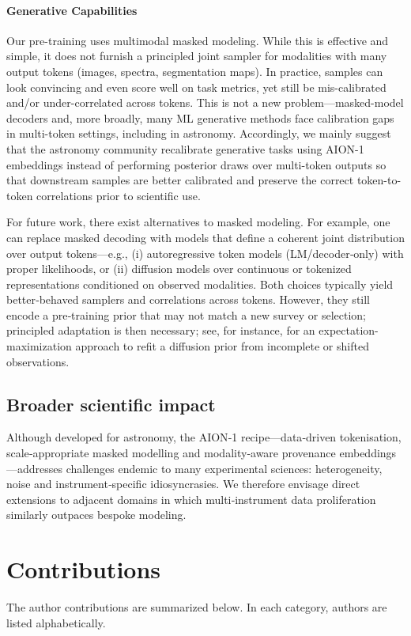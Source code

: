 \documentclass[]{polymathic}
\begin{document}
\paragraph{Generative Capabilities} Our pre-training uses multimodal masked modeling. While this is effective and simple, it does not furnish a principled joint sampler for modalities with many output tokens (images, spectra, segmentation maps). In practice, samples can look convincing and even score well on task metrics, yet still be mis-calibrated and/or under-correlated across tokens. This is not a new problem—masked-model decoders and, more broadly, many ML generative methods face calibration gaps in multi-token settings, including in astronomy. Accordingly, we mainly suggest that the astronomy community recalibrate generative tasks using AION-1 embeddings instead of performing posterior draws over multi-token outputs so that downstream samples are better calibrated and preserve the correct token-to-token correlations prior to scientific use. 

For future work, there exist alternatives to masked modeling. For example, one can replace masked decoding with models that define a coherent joint distribution over output tokens—e.g., (i) autoregressive token models (LM/decoder‑only) with proper likelihoods, or (ii) diffusion models over continuous or tokenized representations conditioned on observed modalities. Both choices typically yield better‑behaved samplers and correlations across tokens. However, they still encode a pre‑training prior that may not match a new survey or selection; principled adaptation is then necessary; see, for instance, \cite{rozet2024learning} for an expectation-maximization approach to refit a diffusion prior from incomplete or shifted observations.

\subsection{Broader scientific impact}
Although developed for astronomy, the AION‑1 recipe—data‑driven tokenisation, scale‑appropriate masked modelling and modality‑aware provenance embeddings—addresses challenges endemic to many experimental sciences: heterogeneity, noise and instrument‑specific idiosyncrasies. We therefore envisage direct extensions to adjacent domains in which multi‑instrument data proliferation similarly outpaces bespoke modeling.

\section{Contributions}
The author contributions are summarized below. In each category, authors are listed alphabetically.
\end{document}
